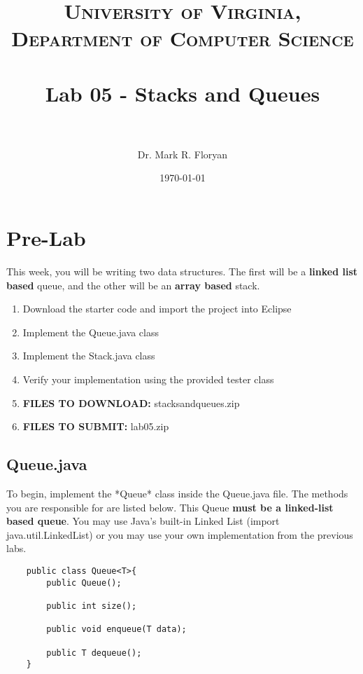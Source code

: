 \documentclass[paper=a4, fontsize=11pt, parskip=full]{scrartcl} %
\title{
\normalfont \normalsize
\textsc{University of Virginia, Department of Computer Science} \\ [25pt] %
\horrule{0.5pt} \\[0.4cm] %
\huge Lab 05 - Stacks and Queues \\ %
\horrule{2pt} \\[0.5cm] %
}
\author{Dr. Mark R. Floryan} %
\date{\normalsize\today} %
\numberwithin{equation}{section} %
\numberwithin{figure}{section} %
\numberwithin{table}{section} %
\begin{document}
\maketitle %


\section{Pre-Lab}

This week, you will be writing two data structures. The first will be a \textbf{linked list based} queue, and the other will be an \textbf{array based} stack.

\begin{enumerate}
	\item Download the starter code and import the project into Eclipse
	\item Implement the Queue.java class
	\item Implement the Stack.java class
	\item Verify your implementation using the provided tester class
	\item \textbf{FILES TO DOWNLOAD:} stacksandqueues.zip
	\item \textbf{FILES TO SUBMIT:} lab05.zip
\end{enumerate}


\subsection{Queue.java}

To begin, implement the *Queue* class inside the Queue.java file. The methods you are responsible for are listed below. This Queue \textbf{must be a linked-list based queue}. You may use Java's built-in Linked List (import java.util.LinkedList) or you may use your own implementation from the previous labs.

\begin{lstlisting}
	public class Queue<T>{
		public Queue();

		public int size();

		public void enqueue(T data);

		public T dequeue();
	}
\end{lstlisting}
\end{document}
